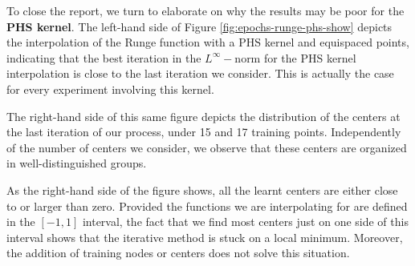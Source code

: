 \documentclass[12pt]{report} %
\begin{document}
To close the report, we turn to elaborate on why the results may be poor for the \textbf{PHS kernel}.
The left-hand side of Figure \ref{fig:epochs-runge-phs-show} depicts the interpolation of the Runge function with a PHS kernel and equispaced points, indicating that the best iteration in the $L^\infty-$norm for the PHS kernel interpolation is close to the last iteration we consider. This is actually the case for every experiment involving this kernel.


The right-hand side of this same figure depicts the distribution of the centers at the last iteration of our process, under 15 and 17 training points. Independently of the number of centers we consider, we observe that these centers are organized in well-distinguished groups.

As the right-hand side of the figure shows, all the learnt centers are either close to or larger than zero. Provided the functions we are interpolating for are defined in the $[-1,1]$ interval, the fact that we find most centers just on one side of this interval shows that the iterative method is stuck on a local minimum. Moreover, the addition of training nodes or centers does not solve this situation.
\end{document}
